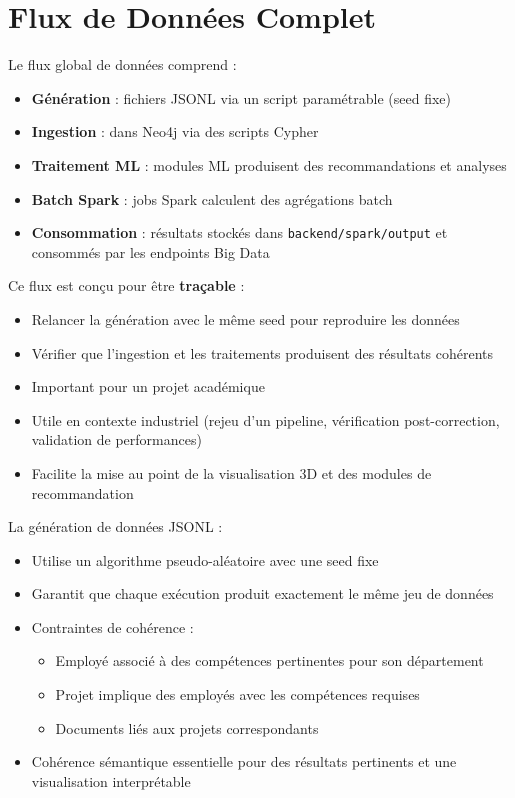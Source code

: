 \documentclass[12pt,a4paper]{report}
\begin{document}
\section{Flux de Données Complet}
Le flux global de données comprend :
\begin{itemize}
  \item \textbf{Génération} : fichiers JSONL via un script paramétrable (seed fixe)
  \item \textbf{Ingestion} : dans Neo4j via des scripts Cypher
  \item \textbf{Traitement ML} : modules ML produisent des recommandations et analyses
  \item \textbf{Batch Spark} : jobs Spark calculent des agrégations batch
  \item \textbf{Consommation} : résultats stockés dans \texttt{backend/spark/output} et consommés par les endpoints Big Data
\end{itemize}

Ce flux est conçu pour être \textbf{traçable} :
\begin{itemize}
  \item Relancer la génération avec le même seed pour reproduire les données
  \item Vérifier que l'ingestion et les traitements produisent des résultats cohérents
  \item Important pour un projet académique
  \item Utile en contexte industriel (rejeu d'un pipeline, vérification post-correction, validation de performances)
  \item Facilite la mise au point de la visualisation 3D et des modules de recommandation
\end{itemize}

La génération de données JSONL :
\begin{itemize}
  \item Utilise un algorithme pseudo-aléatoire avec une seed fixe
  \item Garantit que chaque exécution produit exactement le même jeu de données
  \item Contraintes de cohérence :
    \begin{itemize}
      \item Employé associé à des compétences pertinentes pour son département
      \item Projet implique des employés avec les compétences requises
      \item Documents liés aux projets correspondants
    \end{itemize}
  \item Cohérence sémantique essentielle pour des résultats pertinents et une visualisation interprétable
\end{itemize}
\end{document}
